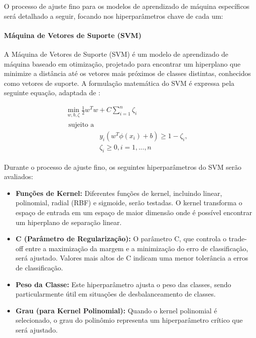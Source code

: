 O processo de ajuste fino para os modelos de aprendizado de máquina específicos será detalhado a seguir, focando nos hiperparâmetros chave de cada um:

\paragraph{Máquina de Vetores de Suporte (SVM)}

A Máquina de Vetores de Suporte (SVM) é um modelo de aprendizado de máquina baseado em otimização, projetado para encontrar um hiperplano que minimize a distância até os vetores mais próximos de classes distintas, conhecidos como vetores de suporte. A formulação matemática do SVM é expressa pela seguinte equação, adaptada de \cite{pedregosa2011scikit}:

\begin{equation}
\label{eq6}
\begin{aligned}\min_ {w, b, \zeta} \frac{1}{2} w^T w + C \sum_{i=1}^{n} \zeta_i\\
\begin{split}\textrm {sujeito a} \\
& y_i (w^T \phi (x_i) + b) \geq 1 - \zeta_i,\\
& \zeta_i \geq 0, i=1, ..., n\end{split}
\end{aligned}
\end{equation}

Durante o processo de ajuste fino, os seguintes hiperparâmetros do SVM serão avaliados:

\begin{itemize}
    \item \textbf{Funções de Kernel:} Diferentes funções de kernel, incluindo linear, polinomial, radial (RBF) e sigmoide, serão testadas. O kernel transforma o espaço de entrada em um espaço de maior dimensão onde é possível encontrar um hiperplano de separação linear.
    \item \textbf{C (Parâmetro de Regularização):} O parâmetro C, que controla o trade-off entre a maximização da margem e a minimização do erro de classificação, será ajustado. Valores mais altos de C indicam uma menor tolerância a erros de classificação.
    \item \textbf{Peso da Classe:} Este hiperparâmetro ajusta o peso das classes, sendo particularmente útil em situações de desbalanceamento de classes.
    \item \textbf{Grau (para Kernel Polinomial):} Quando o kernel polinomial é selecionado, o grau do polinômio representa um hiperparâmetro crítico que será ajustado.
\end{itemize}

